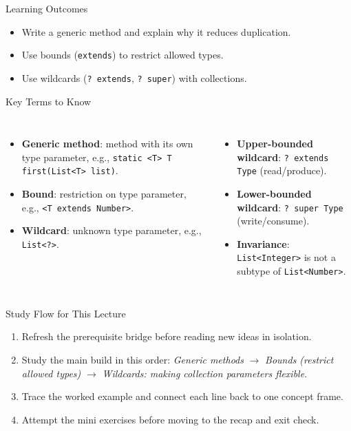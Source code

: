 \documentclass{beamer}
\begin{document}
\begin{frame}{Learning Outcomes}
  \begin{itemize}[<+->]
    \item Write a generic method and explain why it reduces duplication.
    \item Use bounds (\texttt{extends}) to restrict allowed types.
    \item Use wildcards (\texttt{? extends}, \texttt{? super}) with collections.
  \end{itemize}
  \slidesources{\OOPSUnitIVSources}
\end{frame}

\begin{frame}{Key Terms to Know}
\small
\begin{columns}[t]
\begin{itemize}
  \item \textbf{Generic method}: method with its own type parameter, e.g., \texttt{static <T> T first(List<T> list)}.
  \item \textbf{Bound}: restriction on type parameter, e.g., \texttt{<T extends Number>}.
  \item \textbf{Wildcard}: unknown type parameter, e.g., \texttt{List<?>}.
\end{itemize}
\begin{itemize}
  \item \textbf{Upper-bounded wildcard}: \texttt{? extends Type} (read/produce).
  \item \textbf{Lower-bounded wildcard}: \texttt{? super Type} (write/consume).
  \item \textbf{Invariance}: \texttt{List<Integer>} is not a subtype of \texttt{List<Number>}.
\end{itemize}
\end{columns}
  \slidesources{\OOPSUnitIVSources}
\end{frame}

\begin{frame}{Study Flow for This Lecture}
\begin{enumerate}[<+->]
  \item Refresh the prerequisite bridge before reading new ideas in isolation.
  \item Study the main build in this order: \textit{Generic methods} $\rightarrow$ \textit{Bounds (restrict allowed types)} $\rightarrow$ \textit{Wildcards: making collection parameters flexible}.
  \item Trace the worked example and connect each line back to one concept frame.
  \item Attempt the mini exercises before moving to the recap and exit check.
\end{enumerate}
  \slidesources{\OOPSUnitIVSources}
\end{frame}
\end{document}
